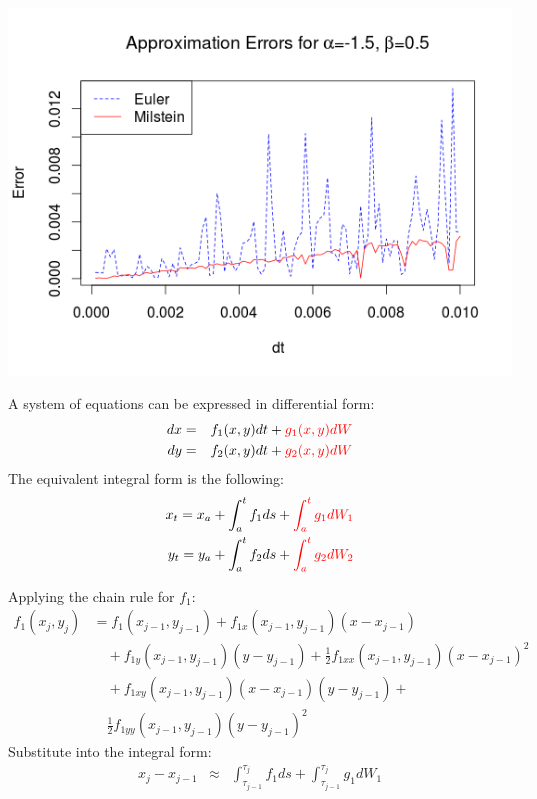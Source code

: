 \begin{frame}
	\begin{center}
	\includegraphics[scale=0.55]{alpham15_beta05.png} 
	\end{center}
\end{frame}

\begin{frame}
A system of equations can be expressed in differential form:
	\begin{eqnarray*}
		dx&=&f_1(x,y)dt+{\color{red}g_1(x,y)dW}\\
		dy&=&f_2(x,y)dt+{\color{red}g_2(x,y)dW}\\
	\end{eqnarray*}
The equivalent integral form is the following:
	\begin{eqnarray*}
		x_t=x_a+\int_{a}^{t}f_1 ds+{\color{red}\int_{a}^{t}g_1dW_1}\\
		y_t=y_a+\int_{a}^{t}f_2 ds+{\color{red}\int_{a}^{t}g_2dW_2}\\
	\end{eqnarray*}	
\end{frame}


\begin{frame}
Applying the chain rule for $f_1$:
	\begin{equation*}
	\begin{split}
	f_1(x_j,y_j) &=f_1(x_{j-1},y_{j-1})+f_{1x}(x_{j-1},y_{j-1})(x-x_{j-1})\\
	& \quad +f_{1y}(x_{j-1},y_{j-1})(y-y_{j-1})+\frac{1}{2} f_{1xx}(x_{j-1},y_{j-1})(x-
	x_{j-1})^2\\
	& \quad +f_{1xy}(x_{j-1},y_{j-1})(x-x_{j-1})(y-y_{j-1})+\\
	& \quad \frac{1}{2}f_{1yy}(x_{j-1},y_{j-1})(y-y_{j-1})^2
	\end{split}
	\end{equation*}
Substitute into the integral form:
	\begin{eqnarray*}
	x_j-x_{j-1} & \approx & \int_{\tau_{j-1}}^{\tau_{j}}f_1 ds+\int_{\tau_{j-1}}^{\tau_{j}}g_1dW_1
	\end{eqnarray*}
\end{frame}


